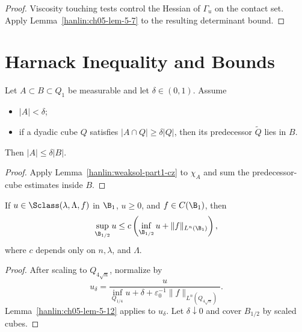 \begin{proof}
\sketch Viscosity touching tests control the Hessian of $\Gamma_u$ on the
contact set. Apply Lemma~\ref{hanlin:ch05-lem-5-7} to the resulting
determinant bound.
\end{proof}

\section{Harnack Inequality and \Calpha Bounds}

\begin{lemma}\label{hanlin:ch05-lem-5-9}
Let $A\subset B\subset Q_1$ be measurable and let $\delta\in(0,1)$.
Assume
\begin{itemize}
\item[(i)] $|A|<\delta$;
\item[(ii)] if a dyadic cube $Q$ satisfies $|A\cap Q|\geq\delta|Q|$,
then its predecessor $\widetilde Q$ lies in $B$.
\end{itemize}
Then $|A|\leq\delta|B|$.
\end{lemma}

\begin{proof}
\sketch Apply Lemma~\ref{hanlin:weaksol-part1-cz} to $\chi_A$ and sum
the predecessor-cube estimates inside $B$.
\end{proof}



\begin{theorem}\label{hanlin:ch05-thm-5-10}
If $u\in\Sclass(\lambda,\Lambda,f)$ in $\B_1$, $u\geq0$, and
$f\in C(\B_1)$, then
\[
\sup_{\B_{1/2}}u
\leq c\left(\inf_{\B_{1/2}}u+\|f\|_{L^n(\B_1)}\right),
\]
where $c$ depends only on $n,\lambda$, and $\Lambda$.
\end{theorem}
\begin{proof}
\sketch After scaling to $Q_{4\sqrt n}$, normalize by
\[
u_\delta=
\frac{u}{\inf_{Q_{1/4}}u+\delta+
\varepsilon_0^{-1}\|f\|_{L^n(Q_{4\sqrt n})}}.
\]
Lemma~\ref{hanlin:ch05-lem-5-12} applies to $u_\delta$. Let
$\delta\downarrow0$ and cover $B_{1/2}$ by scaled cubes.
\end{proof}

